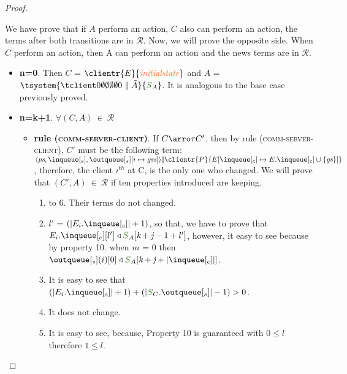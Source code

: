\documentclass[envcountsect,runningheads,orivec]{llncs}
\begin{document}
\begin{proof}
\begin{itemize}
\begin{itemize}
\end{itemize}

\end{itemize}

We have prove that if $A$ perform an action, $C$ also can perform an action, the terms after both transitions are in $\mathcal{R}$. Now, we will prove the opposite side. When $C$ perform an action, then A can perform an action and the news terms are in $\mathcal{R}$.


\begin{itemize}
   \item{\bf n=0}. Then $C$ = $\clientr{E}{\initialstate}$ and $A$ = $\tsystem{\tclienti{0}{\emptyset}{\emptyset}{\emptyset}{\emptyset}{0}\ \bigpar\ \tilde{A}}{\queuemessage_A}$. It is analogous to the base case previously proved.
			
   \item{\bf n=k+1}. $\forall (C,A) \ \in \ \mathcal{R}$
	
			
			\begin{itemize}
				\item {\bf rule (\textsc{comm-server-client})}. If $C \arroi{\tau} C'$, then by rule (\textsc{\footnotesize{comm-server-client}}), $C'$ must be the following term: $\server{\state}{\inserver}{\update{\outserver}{i}{\gss}} \bigpar 
		\clientr{P}{\update{E}{\inclient}{E.\inclient \cup \{\gs\}}}$, therefore, the client $i^{th}$ at C, is the only one who changed. We will prove that $(C',A) \ \in \ \mathcal{R}$ if ten properties introduced are keeping.				
					\begin{enumerate}
						\item to 6. Their terms do not changed.
						\setcounter{enumi}{6}	
							\item $l'$ = $(|E_{i}.\inclient| + 1)$, so that, we have to prove that $E_{i}.\inclient[l'] \triangleleft \queuemessage_A[\tknown + \treceivebuffer - 1 + l']$, however, it easy to see because by property 10. when $m$ = 0 then $\outserver(i)[0] \triangleleft \queuemessage_A[\tknown + \treceivebuffer + |\inclient|]$.
						\item It is easy to see that $(|E_{i}.\inclient| + 1) + (|\queuemessage_C.\outserver|-1) > 0$.
						\item It does not change.
						\item It is easy to see, because, Property 10 is guaranteed with $0 \leq l$ therefore $1 \leq l$. 
					\end{enumerate}
					

\end{itemize}
\end{itemize}
\end{proof}
\end{document}
